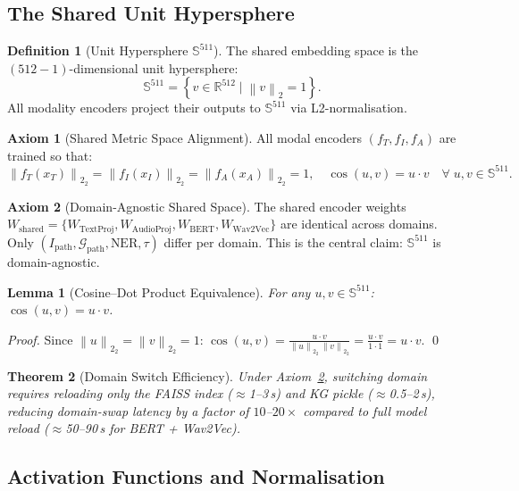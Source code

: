 \documentclass[12pt,a4paper]{article}
\theoremstyle{definition}
\newtheorem{definition}{Definition}[section]
\newtheorem{axiom}{Axiom}[section]
\theoremstyle{plain}
\newtheorem{theorem}{Theorem}[section]
\newtheorem{lemma}[theorem]{Lemma}
\theoremstyle{remark}
\newcommand{\R}{\mathbb{R}}
\newcommand{\Sph}{\mathbb{S}}
\newcommand{\Norm}[1]{\left\|#1\right\|_2}
\newcommand{\KG}{\mathcal{G}}
\begin{document}
\subsection{The Shared Unit Hypersphere}

\begin{definition}[Unit Hypersphere $\Sph^{511}$]
The shared embedding space is the $(512{-}1)$-dimensional unit hypersphere:
\[
  \Sph^{511} = \left\{v \in \R^{512} \;\Big|\; \Norm{v} = 1\right\}.
\]
All modality encoders project their outputs to $\Sph^{511}$ via L2-normalisation.
\end{definition}

\begin{axiom}[Shared Metric Space Alignment]
All modal encoders $(f_T, f_I, f_A)$ are trained so that:
\[
  \Norm{f_T(x_T)}_2 = \Norm{f_I(x_I)}_2 = \Norm{f_A(x_A)}_2 = 1, \quad
  \cos(u,v) = u \cdot v \quad \forall\; u,v \in \Sph^{511}.
\]
\end{axiom}

\begin{axiom}[Domain-Agnostic Shared Space]
\label{ax:shared}
The shared encoder weights
$W_{\text{shared}} = \{W_{\text{TextProj}}, W_{\text{AudioProj}}, W_{\text{BERT}}, W_{\text{Wav2Vec}}\}$
are identical across domains. Only $(I_{\text{path}}, \KG_{\text{path}}, \text{NER}, \tau)$ differ per domain. This is the central claim: $\Sph^{511}$ is domain-agnostic.
\end{axiom}

\begin{lemma}[Cosine–Dot Product Equivalence]
\label{lem:cosdot}
For any $u, v \in \Sph^{511}$: $\cos(u, v) = u \cdot v$.
\end{lemma}
\begin{proof}
Since $\Norm{u}_2 = \Norm{v}_2 = 1$:
$\cos(u,v) = \frac{u \cdot v}{\Norm{u}_2\,\Norm{v}_2} = \frac{u \cdot v}{1 \cdot 1} = u \cdot v.$ \qed
\end{proof}

\begin{theorem}[Domain Switch Efficiency]
\label{thm:switch}
Under Axiom~\ref{ax:shared}, switching domain requires reloading only the FAISS index ($\approx$1--3\,s) and KG pickle ($\approx$0.5--2\,s), reducing domain-swap latency by a factor of $10$--$20\times$ compared to full model reload ($\approx$50--90\,s for BERT + Wav2Vec).
\end{theorem}

\subsection{Activation Functions and Normalisation}
\end{document}
